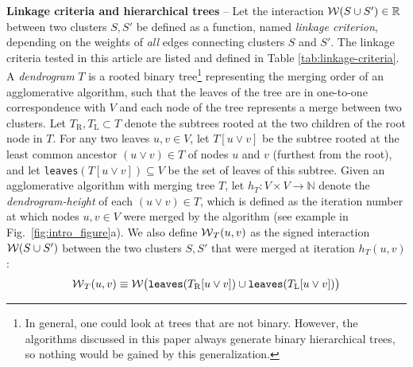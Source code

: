 \textbf{Linkage criteria and hierarchical trees} -- 
Let the interaction $\mathcal{W}(S \cup S')\in\mathbb{R}$ between two clusters $S,S'$ be defined as a function, named \emph{linkage criterion}, depending on the weights of \emph{all} edges connecting clusters $S$ and $S'$.
The linkage criteria tested in this article are listed and defined in Table \ref{tab:linkage-criteria}.
A \emph{dendrogram} $T$ is a rooted binary tree\footnote{In general, one could look at trees that are not binary. However, the algorithms discussed in this paper always generate binary hierarchical trees, so nothing would be gained by this generalization.} representing the merging order of an agglomerative algorithm, such that the leaves of the tree are in one-to-one correspondence with $V$ and each node of the tree represents a merge between two clusters. 
Let $T_{\mathrm{R}},T_{\mathrm{L}}\subset T$ denote the subtrees rooted at the two children of the root node in $T$.
For any two leaves $u,v \in V$, let $T[u \vee v]$ be the subtree rooted at the least common ancestor $(u \vee v)\in T$ of nodes $u$ and $v$ (furthest from the root), and let \texttt{leaves}$(T[u \vee v])\subseteq V$ be the set of leaves of this subtree. 
Given an agglomerative algorithm with merging tree $T$, let $h_T:V \times V \rightarrow \mathbb{N}$ denote the \emph{dendrogram-height} of each $(u\vee v)\in T$, which is defined as the iteration number at which nodes $u,v\in V$ were merged by the algorithm (see example in Fig.~\ref{fig:intro_figure}a). We also define $\mathcal{W}{}_{T}(u,v)$ as the signed interaction $\mathcal{W}{}(S \cup S')$ between the two clusters $S,S'$ that were merged at iteration $h_T(u, v)$: 
\begin{equation}\label{eq:def_dendr_interact}
\mathcal{W}{}_{T}(u,v) \equiv \mathcal{W}{} \big( \text{\texttt{leaves}}(T_{\mathrm{R}}[u \vee v])  \cup  \text{\texttt{leaves}}(T_{\mathrm{L}}[u \vee v]) \big)
\end{equation}




